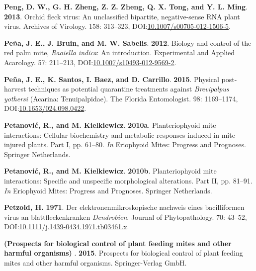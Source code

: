 \documentclass[12pt,final,CPage]{ufthesis}
\newlength{\cslhangindent}
\newenvironment{CSLReferences}[2] %
{%
	\setlength{\parindent}{0pt}
	\ifodd #1 \everypar{\setlength{\hangindent}{\cslhangindent}}\ignorespaces\fi
	\ifnum #2 > 0
	\setlength{\parskip}{#2\baselineskip}
	\fi
}%
{}
\begin{document}
{\begin{CSLReferences}{1}{0}
  \leavevmode{}%
  \textbf{Peng, D. W., G. H. Zheng, Z. Z. Zheng, Q. X. Tong, and Y. L. Ming}. \textbf{2013}. {Orchid fleck virus}: An unclassified bipartite, negative-sense {RNA} plant virus. Archives of Virology. 158: 313--323, DOI:\href{https://doi.org/10.1007/s00705-012-1506-5}{10.1007/s00705-012-1506-5}.

  \leavevmode{}%
  \textbf{Peña, J. E., J. Bruin, and M. W. Sabelis}. \textbf{2012}. Biology and control of the red palm mite, {\emph{Raoiella indica}}: An introduction. Experimental and Applied Acarology. 57: 211--213, DOI:\href{https://doi.org/10.1007/s10493-012-9569-2}{10.1007/s10493-012-9569-2}.

  \leavevmode{}%
  \textbf{Peña, J. E., K. Santos, I. Baez, and D. Carrillo}. \textbf{2015}. Physical post-harvest techniques as potential quarantine treatments against {\emph{Brevipalpus yothersi}} ({Acarina}: {Tenuipalpidae}). The Florida Entomologist. 98: 1169--1174, DOI:\href{https://doi.org/10.1653/024.098.0422}{10.1653/024.098.0422}.

  \leavevmode{}%
  \textbf{Petanović, R., and M. Kielkiewicz}. \textbf{2010a}. Plant{\textendash}eriophyoid mite interactions: Cellular biochemistry and metabolic responses induced in mite-injured plants. Part {I}, pp. 61--80. \emph{In} Eriophyoid Mites: Progress and Prognoses. Springer Netherlands.

  \leavevmode{}%
  \textbf{Petanović, R., and M. Kielkiewicz}. \textbf{2010b}. Plant{\textendash}eriophyoid mite interactions: Specific and unspecific morphological alterations. Part {II}, pp. 81--91. \emph{In} Eriophyoid Mites: Progress and Prognoses. Springer Netherlands.

  \leavevmode{}%
  \textbf{Petzold, H.} \textbf{1971}. Der elektronenmikroskopische nachweis eines bacilliformen virus an blattfleckenkranken {\emph{Dendrobien}}. Journal of Phytopathology. 70: 43--52, DOI:\href{https://doi.org/10.1111/j.1439-0434.1971.tb03461.x}{10.1111/j.1439-0434.1971.tb03461.x}.

  \leavevmode{}%
  \textbf{(Prospects for biological control of plant feeding mites and other harmful organisms) }. \textbf{2015}. Prospects for biological control of plant feeding mites and other harmful organisms. Springer-Verlag GmbH.


\end{CSLReferences}}
\end{document}
